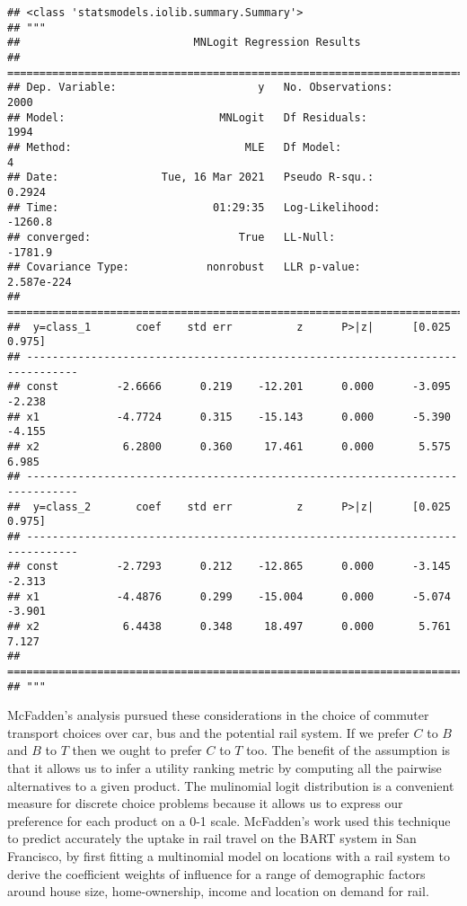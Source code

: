 \documentclass[]{tufte-book}
\theoremstyle{definition}
\theoremstyle{definition}
\theoremstyle{definition}
\theoremstyle{remark}
\begin{document}
\begin{verbatim}
## <class 'statsmodels.iolib.summary.Summary'>
## """
##                           MNLogit Regression Results                          
## ==============================================================================
## Dep. Variable:                      y   No. Observations:                 2000
## Model:                        MNLogit   Df Residuals:                     1994
## Method:                           MLE   Df Model:                            4
## Date:                Tue, 16 Mar 2021   Pseudo R-squ.:                  0.2924
## Time:                        01:29:35   Log-Likelihood:                -1260.8
## converged:                       True   LL-Null:                       -1781.9
## Covariance Type:            nonrobust   LLR p-value:                2.587e-224
## ==============================================================================
##  y=class_1       coef    std err          z      P>|z|      [0.025      0.975]
## ------------------------------------------------------------------------------
## const         -2.6666      0.219    -12.201      0.000      -3.095      -2.238
## x1            -4.7724      0.315    -15.143      0.000      -5.390      -4.155
## x2             6.2800      0.360     17.461      0.000       5.575       6.985
## ------------------------------------------------------------------------------
##  y=class_2       coef    std err          z      P>|z|      [0.025      0.975]
## ------------------------------------------------------------------------------
## const         -2.7293      0.212    -12.865      0.000      -3.145      -2.313
## x1            -4.4876      0.299    -15.004      0.000      -5.074      -3.901
## x2             6.4438      0.348     18.497      0.000       5.761       7.127
## ==============================================================================
## """
\end{verbatim}

McFadden's analysis pursued these considerations in the choice of commuter transport choices over car, bus and the potential rail system. If we prefer \(C\) to \(B\) and \(B\) to \(T\) then we ought to prefer \(C\) to \(T\) too. The benefit of the assumption is that it allows us to infer a utility ranking metric by computing all the pairwise alternatives to a given product. The mulinomial logit distribution is a convenient measure for discrete choice problems because it allows us to express our preference for each product on a 0-1 scale. McFadden's work used this technique to predict accurately the uptake in rail travel on the BART system in San Francisco, by first fitting a multinomial model on locations with a rail system to derive the coefficient weights of influence for a range of demographic factors around house size, home-ownership, income and location on demand for rail.
\end{document}
